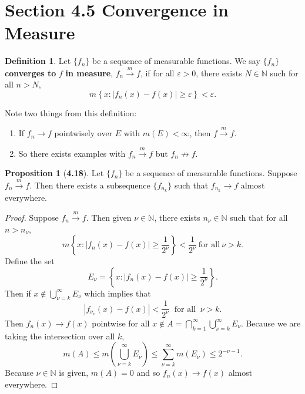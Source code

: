 \documentclass[12pt]{article}
\newcommand{\N}{\mathbb{N}}
\newcommand{\toM}{\overset{m}{\to}}
\renewcommand{\epsilon}{\varepsilon}
\theoremstyle{definition}
\newtheorem*{definition}{Definition}
\newtheorem*{prop}{Proposition}
\begin{document}
\section*{Section 4.5 Convergence in Measure}

\begin{definition}
    Let \( \{f_n\} \) be a sequence of measurable functions. 
    We say \( \{f_n\} \) \textbf{converges to} \( \displaystyle f \) \textbf{in measure}, \( f_n \overset{m}{\to} f\), if for all \( \epsilon > 0 \), there exists \( N \in \N \) such for all \( n > N \), 
        \[
            m \left\{ x: \left| f_n(x) - f(x) \right| \geq \epsilon \right\} < \epsilon.
        \]
\end{definition}

Note two things from this definition:
    \begin{enumerate}[label = (\arabic{*})]
        \item If \( f_n \to f \) pointwisely over \( E \) with \( m(E) < \infty \), then \( f \toM f \).
        \item So there exists examples with \( f_n \toM f \) but \( f_n \not\to f \).
    \end{enumerate}

\begin{prop}[\textbf{4.18}]

   Let \( \{f_n\} \) be a sequence of measurable functions. Suppose \( f_n \toM f \). Then there exists a subsequence \( \{f_{n_{k}} \} \) such that \( f_{n_{k}}  \to f \) almost everywhere.

    \begin{proof}
        Suppose \( f_n \toM f \). Then given \( \nu \in \N \), there exists \( n_{\nu} \in \N \) such that for all \( n > n_{\nu} \),
            \[
                m \left\{ x: \left| f_n(x) - f(x) \right| \geq \frac{1}{2^{\nu}}  \right\} < \frac{1}{2^{\nu}} \ \text{for all} \ \nu > k.
            \]
        Define the set 
            \[
                E_{\nu} =  \left\{ x: \left| f_n(x) - f(x) \right| \geq \frac{1}{2^{\nu}}  \right\}.
            \]
        Then if \( \displaystyle x \not\in \bigcup_{\nu = k }^{\infty} E_{\nu} \) which implies that
            \[
                |f_{\nu_{v}}(x) - f(x)| < \frac{1}{2^{\nu}} \ \text{ for all } \ \nu > k.
            \]
        Then \( f_n(x) \to f(x) \) pointwise for all \( \displaystyle x \not\in A = \bigcap_{k=1}^{\infty} \bigcup_{\nu = k }^{\infty} E_{\nu} \). Because we are taking the intersection over all \( k \),
            \[
                m(A) \leq m \left(\bigcup_{\nu = k }^{\infty} E_{\nu}  \right) \leq \sum_{\nu = k}^{\infty} m\left(E_{\nu}\right) \leq 2^{-\nu - 1}.
            \]
        Because  \( \nu \in \N \) is given, \( m(A) = 0 \) and so \( f_n(x) \to f(x) \) almost everywhere. 
    \end{proof}
\end{prop}
\end{document}
